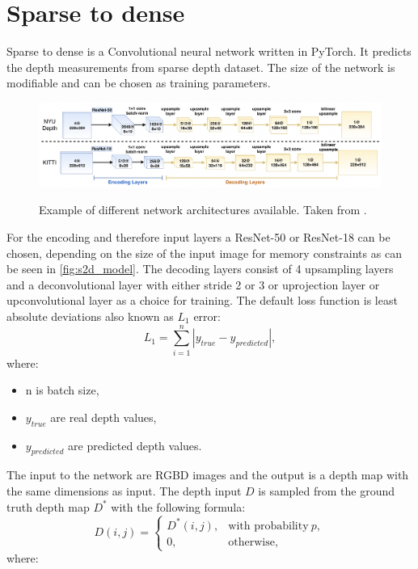 \documentclass[twoside]{ctuthesis}
\theoremstyle{plain}
\theoremstyle{definition}
\theoremstyle{note}
\begin{document}
\section{Sparse to dense} \label{s2d}
Sparse to dense is a Convolutional neural network written in PyTorch. \cite{ma2018sparsetodense} It predicts the depth measurements from sparse depth dataset. The size of the network is modifiable and can be chosen as training parameters.
\begin{figure}
	\caption{Example of different network architectures available. Taken from \cite{ma2018sparsetodense}.}
	\includegraphics[width=\textwidth]{sparse2dense.png}
	\centering
	\label{fig:s2d_model}
\end{figure}
For the encoding and therefore input layers a ResNet-50 or ResNet-18 can be chosen, depending on the size of the input image for memory constraints as can be seen in \autoref{fig:s2d_model}. The decoding layers consist of 4 upsampling layers and a deconvolutional layer with either stride 2 or 3 or uprojection layer or upconvolutional layer as a choice for training. The default loss function is least absolute deviations also known as $L_1$ error:
\begin{equation}
	L_1=\sum_{i=1}^{n}|y_{true}-y_{predicted}|,
\end{equation}
where:
\begin{itemize}
	\item n is batch size,
	\item $y_{true}$ are real depth values,
	\item $y_{predicted}$ are predicted depth values.
\end{itemize}
The input to the network are RGBD images and the output is a depth map with the same dimensions as input. The depth input $D$ is sampled from the ground truth depth map $D^*$ with the following formula:
\begin{equation}
	D(i,j)=\begin{cases}
		D^*(i,j),&\text{with probability}\ p,\\
		0,&\text{otherwise},
	\end{cases}
\end{equation}
where:
\end{document}
